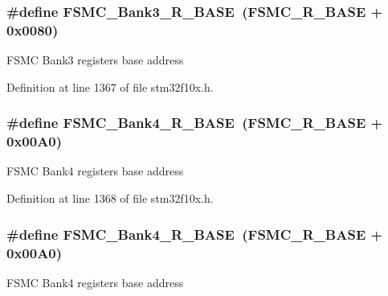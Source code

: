 \subsubsection[{\texorpdfstring{F\+S\+M\+C\+\_\+\+Bank3\+\_\+\+R\+\_\+\+B\+A\+SE}{FSMC_Bank3_R_BASE}}]{\setlength{\rightskip}{0pt plus 5cm}\#define F\+S\+M\+C\+\_\+\+Bank3\+\_\+\+R\+\_\+\+B\+A\+SE~({\bf F\+S\+M\+C\+\_\+\+R\+\_\+\+B\+A\+SE} + 0x0080)}\hypertarget{group___peripheral__memory__map_gacf056152c9e5aefcc67db78d1302c0d7}{}\label{group___peripheral__memory__map_gacf056152c9e5aefcc67db78d1302c0d7}
F\+S\+MC Bank3 registers base address 

Definition at line 1367 of file stm32f10x.\+h.

\subsubsection[{\texorpdfstring{F\+S\+M\+C\+\_\+\+Bank4\+\_\+\+R\+\_\+\+B\+A\+SE}{FSMC_Bank4_R_BASE}}]{\setlength{\rightskip}{0pt plus 5cm}\#define F\+S\+M\+C\+\_\+\+Bank4\+\_\+\+R\+\_\+\+B\+A\+SE~({\bf F\+S\+M\+C\+\_\+\+R\+\_\+\+B\+A\+SE} + 0x00\+A0)}\hypertarget{group___peripheral__memory__map_gaf9e5417133160b0bdd0498d982acec19}{}\label{group___peripheral__memory__map_gaf9e5417133160b0bdd0498d982acec19}
F\+S\+MC Bank4 registers base address 

Definition at line 1368 of file stm32f10x.\+h.

\subsubsection[{\texorpdfstring{F\+S\+M\+C\+\_\+\+Bank4\+\_\+\+R\+\_\+\+B\+A\+SE}{FSMC_Bank4_R_BASE}}]{\setlength{\rightskip}{0pt plus 5cm}\#define F\+S\+M\+C\+\_\+\+Bank4\+\_\+\+R\+\_\+\+B\+A\+SE~({\bf F\+S\+M\+C\+\_\+\+R\+\_\+\+B\+A\+SE} + 0x00\+A0)}\hypertarget{group___peripheral__memory__map_gaf9e5417133160b0bdd0498d982acec19}{}\label{group___peripheral__memory__map_gaf9e5417133160b0bdd0498d982acec19}
F\+S\+MC Bank4 registers base address 

